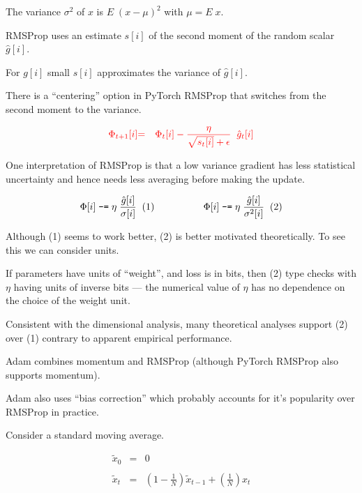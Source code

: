 {\vfill
The variance $\sigma^2$ of $x$ is $E \;(x - \mu)^2$ with $\mu = E\;x$.

\vfill
RMSProp uses an estimate $s[i]$ of the second moment of the random scalar $\hat{g}[i]$.

\vfill
For $g[i]$ small $s[i]$ approximates the variance of $\hat{g}[i]$.

\vfill
There is a ``centering'' option in PyTorch RMSProp that switches from the second moment to the variance.

\begin{eqnarray*}
{\color{red} \Phi_{t+1}[i]} & {\color{red} =} & {\color{red} \Phi_t[i] - \frac{\eta}{\sqrt{s_t[i]} + \epsilon}\;\; \hat{g}_t[i]}
\end{eqnarray*}

\vfill
One interpretation of RMSProp is that a low variance gradient has less statistical uncertainty and hence needs less averaging before making the update.


{\color{red} $$\Phi[i] \;\mbox{\tt -=} \; \eta\;\frac{\hat{g}[i]}{\sigma[i]}\;\;(1)\hspace{5em}\Phi[i] \;\mbox{\tt -=} \; \eta\;\frac{\hat{g}[i]}{\sigma^2[i]}\;\;(2)$$}

\vfill
Although (1) seems to work better, (2) is better motivated theoretically.  To see this we can consider units.

\vfill
If parameters have units of ``weight'', and loss is in bits, then (2) type checks with $\eta$ having units of inverse bits --- the numerical value of $\eta$
has no dependence on the choice of the weight unit.

\vfill
Consistent with the dimensional analysis, many theoretical analyses support (2) over (1) contrary to apparent empirical performance.

Adam combines momentum and RMSProp (although PyTorch RMSProp also supports momentum).

\vfill
Adam also uses ``bias correction'' which probably accounts for it's popularity over RMSProp in practice.


Consider a standard moving average.

\begin{eqnarray*}
\tilde{x}_0 & = & 0 \\
\\
\tilde{x}_t & = & \left(1-\frac{1}{N}\right)\tilde{x}_{t-1} + \left(\frac{1}{N}\right)x_t
\end{eqnarray*}

}
